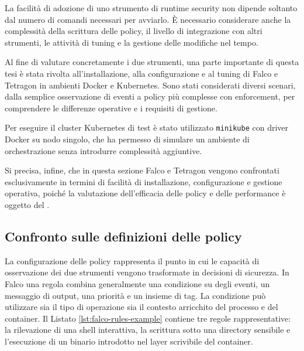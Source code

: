 \documentclass[12pt,a4paper,openright,twoside]{book}
\begin{document}
La facilità di adozione di uno strumento di runtime security non dipende soltanto dal numero di comandi necessari per avviarlo. È necessario considerare anche la complessità della scrittura delle policy, il livello di integrazione con altri strumenti, le attività di tuning e la gestione delle modifiche nel tempo. 

Al fine di valutare concretamente i due strumenti, una parte importante di questa tesi è stata rivolta all'installazione, alla configurazione e al tuning di Falco e Tetragon in ambienti Docker e Kubernetes. Sono stati considerati diversi scenari, dalla semplice osservazione di eventi a policy più complesse con enforcement, per comprendere le differenze operative e i requisiti di gestione.

Per eseguire il cluster Kubernetes di test è stato utilizzato \texttt{minikube} \cite{minikube} con driver Docker su nodo singolo, che ha permesso di simulare un ambiente di orchestrazione senza introdurre complessità aggiuntive.

Si precisa, infine, che in questa sezione Falco e Tetragon vengono confrontati esclusivamente in termini di facilità di installazione, configurazione e gestione operativa, poiché la valutazione dell'efficacia delle policy e delle performance è oggetto del .

\subsection{Confronto sulle definizioni delle policy}
\label{sec:rules-and-policies}

La configurazione delle policy rappresenta il punto in cui le capacità di osservazione dei due strumenti vengono trasformate in decisioni di sicurezza. In Falco una regola combina generalmente una condizione su degli eventi, un messaggio di output, una priorità e un insieme di tag. La condizione può utilizzare sia il tipo di operazione sia il contesto arricchito del processo e del container. Il Listato \ref{lst:falco-rules-example} contiene tre regole rappresentative: la rilevazione di una shell interattiva, la scrittura sotto una directory sensibile e l'esecuzione di un binario introdotto nel layer scrivibile del container.


\end{document}
